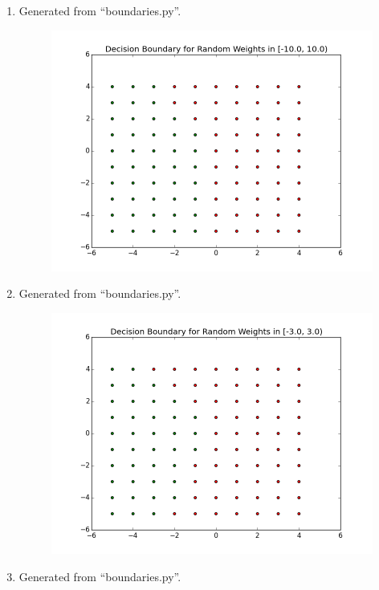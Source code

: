 \documentclass[12pt]{article}
\begin{document}
\begin{enumerate}
    \begin{enumerate}
      \item
        Generated from ``boundaries.py''.
        \begin{figure}[H]
          \includegraphics[width=\linewidth]{neg_10_10.png}
        \end{figure}
      \item
        Generated from ``boundaries.py''.
        \begin{figure}[H]
          \includegraphics[width=\linewidth]{neg_3_3.png}
        \end{figure}
      \item
        Generated from ``boundaries.py''.
        \begin{figure}[H]

\end{figure}
\end{enumerate}
\end{enumerate}
\end{document}
